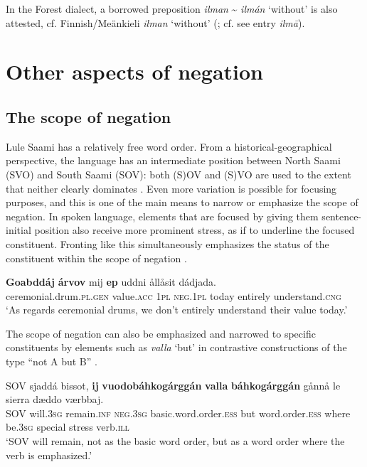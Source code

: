 \documentclass[output=paper,colorlinks,citecolor=brown]{langscibook}
\begin{document}
In the Forest dialect, a borrowed preposition \textit{ilman} {\textasciitilde} \textit{ilmán} ‘without’ is also attested, cf. Finnish/Meänkieli \textit{ilman}  ‘without’ (\citealt[121, 123]{Kejonen2022}; cf. \citealt{Grundström1946} see entry \textit{ilmā}).

\newpage
\section{Other aspects of negation} \label{sec:lul:4}
\subsection{The scope of negation} \label{sec:lul:4.1}

Lule Saami has a relatively free word order. From a historical-geographical perspective, the language has an intermediate position between North Saami (SVO) and South Saami (SOV): both (S)OV and (S)VO are used to the extent that neither clearly dominates \citep{Mikkelsen2011}. Even more variation is possible for focusing purposes, and this is one of the main means to narrow or emphasize the scope of negation. In spoken language, elements that are focused by giving them sentence-initial position also receive more prominent stress, as if to underline the focused constituent. Fronting like this simultaneously emphasizes the status of the constituent within the scope of negation .

\ea\label{ex:lul:46} 
    \gll \textbf{Goabddáj} \textbf{árvov} mij \textbf{ep} uddni ållåsit dádjada. \\ 
         ceremonial.drum.\textsc{pl.gen} value.\textsc{acc} \textsc{1pl} \textsc{neg.1pl} today entirely understand.\textsc{cng} \\
    \glt ‘As regards ceremonial drums, we don’t entirely understand their value today.’ \citep{SIKOR2021}
\z 

The scope of negation can also be emphasized and narrowed to specific constituents by elements such as \textit{valla} ‘but’ in contrastive constructions of the type “not A but B” .

\ea\label{ex:lul:47} 
    \gll SOV sjaddá bissot, \textbf{ij} \textbf{vuodobáhkogárggán} \textbf{valla} \textbf{báhkogárggán} gånnå le sierra dæddo værbbaj.\\ 
         SOV will.\textsc{3sg} remain.\textsc{inf} \textsc{neg.3sg} basic.word.order.\textsc{ess} but word.order.\textsc{ess}  where be.\textsc{3sg} special stress verb.\textsc{ill}  \\
    \glt ‘SOV will remain, not as the basic word order, but as a word order where the verb is emphasized.’ \citep{SIKOR2021}
\z
\end{document}
